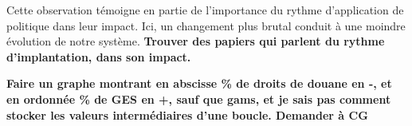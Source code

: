 Cette observation témoigne en partie de l'importance du rythme d'application de politique dans leur impact. Ici, un changement plus brutal conduit à une moindre évolution de notre système. \textbf{Trouver des papiers qui parlent du rythme d'implantation, dans son impact.}

\textbf{Faire un graphe montrant en abscisse \% de droits de douane en -, et en ordonnée \% de GES en +, sauf que gams, et je sais pas comment stocker les valeurs intermédiaires d'une boucle. Demander à CG}
